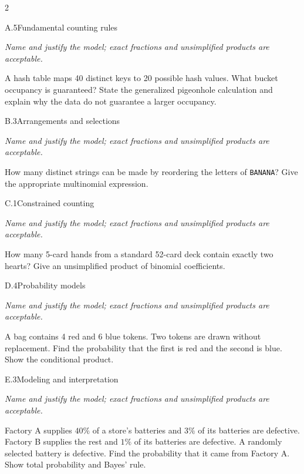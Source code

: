 \documentclass[9pt]{extarticle}
\begin{document}
\CoreWorkArea
\FormBreak
{}
\begin{multicols}{2}
\begin{CoreProblem}{A.5}{Fundamental counting rules}
{\scriptsize\textit{Name and justify the model; exact fractions and unsimplified products are acceptable.}\par}
A hash table maps 40 distinct keys to 20 possible hash values. What
    bucket occupancy is guaranteed? State the generalized pigeonhole calculation
    and explain why the data do not guarantee a larger occupancy.
\end{CoreProblem}
\begin{CoreProblem}{B.3}{Arrangements and selections}
{\scriptsize\textit{Name and justify the model; exact fractions and unsimplified products are acceptable.}\par}
How many distinct strings can be made by reordering the letters of
    \texttt{BANANA}? Give the appropriate multinomial expression.
\end{CoreProblem}
\begin{CoreProblem}{C.1}{Constrained counting}
{\scriptsize\textit{Name and justify the model; exact fractions and unsimplified products are acceptable.}\par}
How many 5-card hands from a standard 52-card deck contain exactly
    two hearts? Give an unsimplified product of binomial coefficients.
\end{CoreProblem}
\columnbreak
\begin{CoreProblem}{D.4}{Probability models}
{\scriptsize\textit{Name and justify the model; exact fractions and unsimplified products are acceptable.}\par}
A bag contains 4 red and 6 blue tokens. Two tokens are drawn without
    replacement. Find the probability that the first is red and the second is
    blue. Show the conditional product.
\end{CoreProblem}
\begin{CoreProblem}{E.3}{Modeling and interpretation}
{\scriptsize\textit{Name and justify the model; exact fractions and unsimplified products are acceptable.}\par}
Factory A supplies $40\%$ of a store's batteries and $3\%$ of its
    batteries are defective. Factory B supplies the rest and $1\%$ of its
    batteries are defective. A randomly selected battery is defective. Find the
    probability that it came from Factory A. Show total probability and Bayes'
    rule.
\end{CoreProblem}
\end{multicols}
\end{document}
